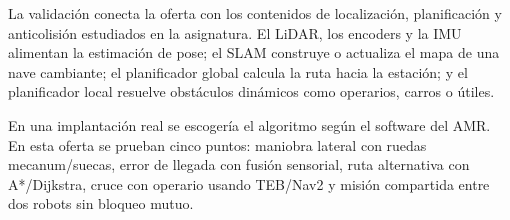 La validación conecta la oferta con los contenidos de localización, planificación y anticolisión estudiados en la asignatura. El LiDAR, los encoders y la IMU alimentan la estimación de pose; el SLAM construye o actualiza el mapa de una nave cambiante; el planificador global calcula la ruta hacia la estación; y el planificador local resuelve obstáculos dinámicos como operarios, carros o útiles.

En una implantación real se escogería el algoritmo según el software del AMR. En esta oferta se prueban cinco puntos: maniobra lateral con ruedas mecanum/suecas, error de llegada con fusión sensorial, ruta alternativa con A*/Dijkstra, cruce con operario usando TEB/Nav2 y misión compartida entre dos robots sin bloqueo mutuo.
